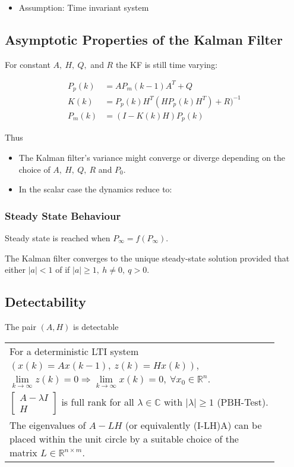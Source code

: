 \documentclass[10pt,a4paper]{scrartcl}
\begin{document}
\begin{multicols*}{2}
\begin{itemize}
\item Assumption: Time invariant system

\end{itemize}

\subsection{Asymptotic Properties of the Kalman Filter}

For constant $A,\ H,\ Q,$ and $R$ the KF is still time varying:

\begin{align*}
P_p(k)&=AP_m(k-1)A^T+Q\\
K(k)&=P_p(k)H^T(HP_p(k)H^T)+R)^{-1}\\
P_m(k)&=(I-K(k)H)P_p(k)
\end{align*}

Thus


\begin{itemize}
\item The Kalman filter's variance might converge or diverge depending on the choice of $A,\ H,\ Q,\ R$ and $P_0$.
\item In the scalar case the dynamics reduce to:

\end{itemize}

\subsubsection{Steady State Behaviour}

Steady state is reached when $P_\infty = f(P_\infty)$.

The Kalman filter converges to the unique steady-state solution provided that either $|a|<1$ of if $|a|\geq 1,\ h\neq 0,\ q>0$.

\subsection{Detectability}

The pair $(A,H)$ is detectable

\begin{tabular}{@{$\Leftrightarrow\ $}p{0.9\linewidth}}
For a deterministic LTI system $(x(k)=Ax(k-1),\ z(k)=Hx(k))$, $\lim\limits_{k\rightarrow\infty}z(k)=0\Rightarrow\lim\limits_{k\rightarrow\infty}x(k)=0,\ \forall x_0\in\mathbb{R}^n$.\\
$\begin{bmatrix}
A-\lambda I\\H
\end{bmatrix}$ is full rank for all $\lambda\in\mathbb{C}$ with $|\lambda|\geq 1$ (PBH-Test).\\
The eigenvalues of $A-LH$ (or equivalently (I-LH)A) can be placed within the unit circle by a suitable choice of the matrix $L\in\mathbb{R}^{n\times m}$.
\end{tabular}


\end{multicols*}
\end{document}
